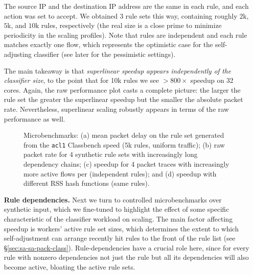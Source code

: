 \noindent %
The source IP and the destination IP address are the same in each rule, and each action was set to accept. We obtained 3 rule sets this way, containing roughly $2$k, $5$k, and $10$k rules, respectively (the real size is a close prime to minimize periodicity in the scaling profiles). Note that rules are independent and each rule matches exactly one flow, which represents the optimistic case for the self-adjusting classifier (see later for the pessimistic settings).

The main takeaway is that \emph{superlinear speedup appears independently of the classifier size}, to the point that for 10k rules we see $>800\times$ speedup on 32 cores. Again, the raw performance plot casts a complete picture: the larger the rule set the greater the superlinear speedup but the smaller the absolute packet rate. Nevertheless, superlinear scaling robustly appears in terms of the raw performance as well.

\begin{figure*}[t]
  \centering
  \hspace{-1.4em}
  \hspace{-1.4em}
  \hspace{-1.4em}
  \caption{Microbenchmarks: (a) mean packet delay on the rule set generated from the \texttt{acl1} Classbench speed (5k rules, uniform traffic); (b) raw packet rate for 4 synthetic rule sets with increasingly long dependency chains; (c) speedup for 4 packet traces with increasingly more active flows per (independent rules); and (d) speedup with different RSS hash functions (same rules).}
  \label{fig:microbenchmark}
\end{figure*}

\noindent%
\textbf{Rule dependencies.} %
Next we turn to controlled microbenchmarks over synthetic input, which we fine-tuned to highlight the effect of some specific characteristic of the classifier workload on scaling. The main factor affecting speedup is workers' active rule set sizes, which determines the extent to which self-adjustment can arrange recently hit rules to the front of the rule list (see \S\ref{sec:sa-sa-pack-class}). Rule-dependencies have a crucial role here, since for every rule with nonzero dependencies not just the rule but all its dependencies will also become active, bloating the active rule sets.


